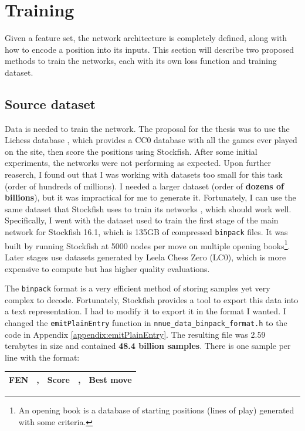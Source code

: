 \section{Training}

Given a feature set, the network architecture is completely defined, along with how to encode a position into its inputs. This section will describe two proposed methods to train the networks, each with its own loss function and training dataset.

\subsection{Source dataset}

Data is needed to train the network. The proposal for the thesis was to use the Lichess database \cite{lichessdb}, which provides a CC0 database with all the games ever played on the site, then score the positions using Stockfish. After some initial experiments, the networks were not performing as expected. Upon further reaserch, I found out that I was working with datasets too small for this task (order of hundreds of millions). I needed a larger dataset (order of \textbf{dozens of billions}), but it was impractical for me to generate it. Fortunately, I can use the same dataset that Stockfish uses to train its networks \cite{sf_nnue_dataset}, which should work well. Specifically, I went with the dataset used to train the first stage of the main network for Stockfish 16.1, which is 135GB of compressed \texttt{binpack} files. It was built by running Stockfish at 5000 nodes per move on multiple opening books\footnote{An opening book is a database of starting positions (lines of play) generated with some criteria.}. Later stages use datasets generated by Leela Chess Zero (LC0), which is more expensive to compute but has higher quality evaluations.

The \texttt{binpack} format is a very efficient method of storing samples yet very complex to decode. Fortunately, Stockfish provides a tool to export this data into a text representation. I had to modify it to export it in the format I wanted. I changed the \texttt{emitPlainEntry} function in \texttt{nnue\_data\_binpack\_format.h} to the code in Appendix \ref{appendix:emitPlainEntry}. The resulting file was 2.59 terabytes in size and contained \textbf{48.4 billion samples}. There is one sample per line with the format:

\begin{center}
\begin{tabular}{|cp{0.0005cm}cp{0.0005cm}c|}
\hline
\textbf{FEN\footnotemark} & , & \textbf{Score} & , & \textbf{Best move} \\
\hline
\end{tabular}
\end{center}

